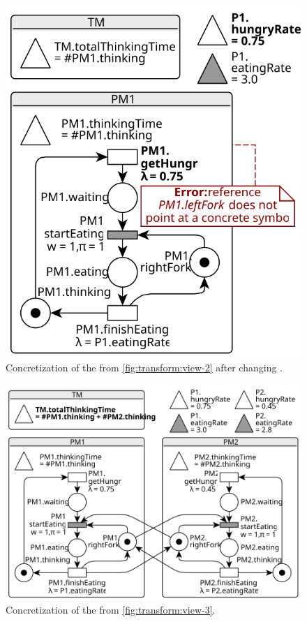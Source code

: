 \begin{figure}
\begin{minipage}[t]{0.5\textwidth}
    \includegraphics[scale=0.9]{figures/concrete_rgspn_example_2}
    \caption{\protect\RaggedRight Concretization of the  from \vref{fig:transform:view-2} after changing .}
    \label{fig:transform:concrete-2}
  \end{minipage}%
\end{figure}

\begin{figure}
  \centering
  \includegraphics[scale=0.9]{figures/concrete_rgspn_example}
  \caption{Concretization of the  from \vref{fig:transform:view-3}.}
  \label{fig:transform:concrete-3}
\end{figure}

